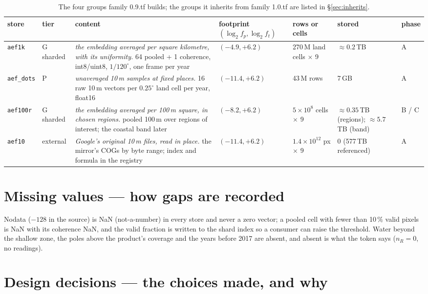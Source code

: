 \documentclass[10pt]{article}
\newcommand{\code}[1]{\texttt{#1}}
\begin{document}
\begin{table}[H]
\centering\setlength{\tabcolsep}{3pt}\footnotesize
\begin{tabular}{@{}L{1.5cm}L{1.3cm}L{4.6cm}L{2.0cm}L{2.2cm}L{1.6cm}L{0.7cm}@{}}
\toprule
store & tier & content & footprint $(\log_2 f_p, \log_2 f_t)$ & rows or cells & stored & phase \\
\midrule
\code{aef1k} & G sharded & \emph{the embedding averaged per square kilometre, with its uniformity.} 64 pooled + 1 coherence, int8/uint8, $1/120^\circ$, one frame per year & $(-4.9, +6.2)$ & 270\,M land cells $\times$ 9 & $\approx 0.2$\,TB & A \\
\code{aef\_dots} & P & \emph{unaveraged 10\,m samples at fixed places.} 16 raw 10\,m vectors per $0.25^\circ$ land cell per year, float16 & $(-11.4, +6.2)$ & 43\,M rows & 7\,GB & A \\
\code{aef100r} & G sharded & \emph{the embedding averaged per 100\,m square, in chosen regions.} pooled 100\,m over regions of interest; the coastal band later & $(-8.2, +6.2)$ & $5 \times 10^8$ cells $\times$ 9 & $\approx 0.35$\,TB (regions); $\approx 5.7$\,TB (band) & B / C \\
\code{aef10} & external & \emph{Google's original 10\,m files, read in place.} the mirror's COGs by byte range; index and formula in the registry & $(-11.4, +6.2)$ & $1.4 \times 10^{12}$ px $\times$ 9 & 0 (577\,TB referenced) & A \\
\bottomrule
\end{tabular}
\caption{The four groups family 0.9.tf builds; the groups it inherits from family 1.0.tf are listed in \S\ref{sec:inherits}.}
\end{table}

\section{Missing values --- how gaps are recorded}

Nodata ($-128$ in the source) is NaN (not-a-number) in every store and never a zero
vector; a pooled cell with fewer than 10\,\% valid pixels is NaN with its
coherence NaN, and the valid fraction is written to the shard index so a
consumer can raise the threshold. Water beyond the shallow zone, the poles
above the product's coverage and the years before 2017 are absent, and
absent is what the token says ($n_R = 0$, no readings).

\section{Design decisions --- the choices made, and why}
\end{document}
